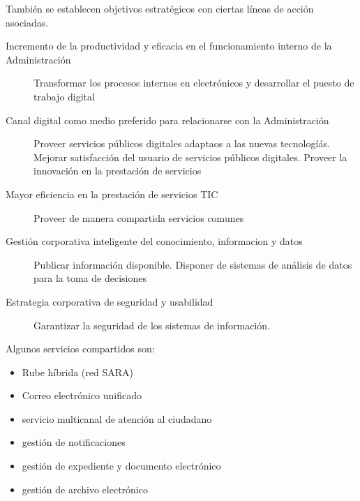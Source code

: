     También se establecen objetivos estratégicos con ciertas líneas de acción asociadas.
    \begin{description}
        \item[Incremento de la productividad y eficacia en el funcionamiento interno de la Administración] Transformar los procesos internos en electrónicos y desarrollar el puesto de trabajo digital
        \item[Canal digital como medio preferido para relacionarse con la Administración] Proveer servicios públicos digitales adaptaos a las nuevas tecnologíás. Mejorar satisfacción del usuario  de servicios públicos digitales. Proveer la innovación en la prestación de servicios
        \item[Mayor eficiencia en la prestación de servicios TIC] Proveer de manera compartida servicios comunes
        \item[Gestión corporativa inteligente del conocimiento, informacion y datos] Publicar información disponible. Disponer de sistemas de análisis de datos para la toma de decisiones
        \item[Estrategia corporativa de seguridad y usabilidad] Garantizar la seguridad de los sistemas de información.
    \end{description}
    Algunos servicios compartidos son:
    \begin{itemize}
        \item Rube híbrida (red SARA)
        \item Correo electrónico unificado
        \item servicio multicanal de atención al ciudadano
        \item gestión de notificaciones
        \item gestión de expediente y documento electrónico
        \item gestión de archivo electrónico
    \end{itemize}
